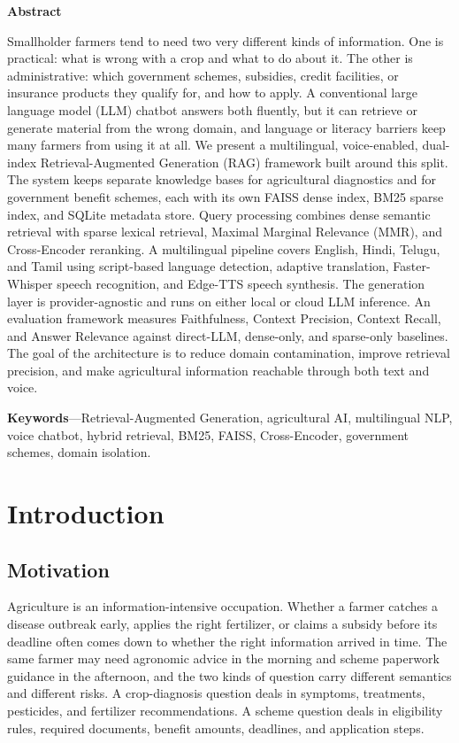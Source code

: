 \documentclass[10pt,twocolumn,letterpaper]{article}
\begin{document}
{\noindent\normalsize\bfseries Abstract\par}
\vspace{2pt}
\noindent Smallholder farmers tend to need two very different kinds of information. One is practical: what is wrong with a crop and what to do about it. The other is administrative: which government schemes, subsidies, credit facilities, or insurance products they qualify for, and how to apply. A conventional large language model (LLM) chatbot answers both fluently, but it can retrieve or generate material from the wrong domain, and language or literacy barriers keep many farmers from using it at all. We present a multilingual, voice-enabled, dual-index Retrieval-Augmented Generation (RAG) framework built around this split. The system keeps separate knowledge bases for agricultural diagnostics and for government benefit schemes, each with its own FAISS dense index, BM25 sparse index, and SQLite metadata store. Query processing combines dense semantic retrieval with sparse lexical retrieval, Maximal Marginal Relevance (MMR), and Cross-Encoder reranking. A multilingual pipeline covers English, Hindi, Telugu, and Tamil using script-based language detection, adaptive translation, Faster-Whisper speech recognition, and Edge-TTS speech synthesis. The generation layer is provider-agnostic and runs on either local or cloud LLM inference. An evaluation framework measures Faithfulness, Context Precision, Context Recall, and Answer Relevance against direct-LLM, dense-only, and sparse-only baselines. The goal of the architecture is to reduce domain contamination, improve retrieval precision, and make agricultural information reachable through both text and voice.

\vspace{6pt}
\noindent\textbf{Keywords}---Retrieval-Augmented Generation, agricultural AI, multilingual NLP, voice chatbot, hybrid retrieval, BM25, FAISS, Cross-Encoder, government schemes, domain isolation.
\vspace{6pt}

\section{Introduction}
\subsection{Motivation}
Agriculture is an information-intensive occupation. Whether a farmer catches a disease outbreak early, applies the right fertilizer, or claims a subsidy before its deadline often comes down to whether the right information arrived in time. The same farmer may need agronomic advice in the morning and scheme paperwork guidance in the afternoon, and the two kinds of question carry different semantics and different risks. A crop-diagnosis question deals in symptoms, treatments, pesticides, and fertilizer recommendations. A scheme question deals in eligibility rules, required documents, benefit amounts, deadlines, and application steps.
\end{document}
